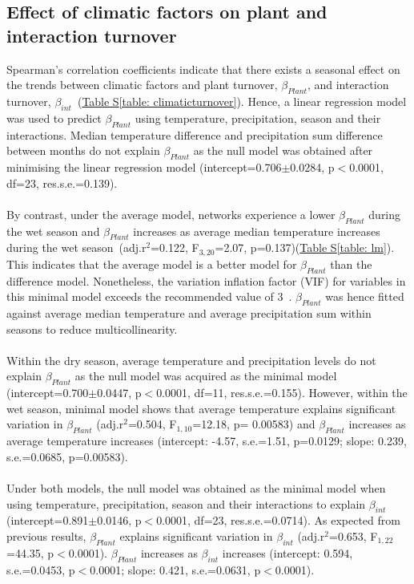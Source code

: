 \documentclass[11pt]{article}
\begin{document}
\vspace{0.5cm}
\subsection{Effect of climatic factors on plant and interaction turnover}
\label{subsec: climate}
Spearman's correlation coefficients indicate that there exists a seasonal effect on the trends between climatic factors and plant turnover, $\beta_{Plant}$, and interaction turnover, $\beta_{int}$~(\hyperref[table: climaticturnover]{Table S\ref{table: climaticturnover}}). Hence, a linear regression model was used to predict $\beta_{Plant}$ using temperature, precipitation, season and their interactions. Median temperature difference and precipitation sum difference between months do not explain $\beta_{Plant}$ as the null model was obtained after minimising the linear regression model (intercept=0.706$\pm$0.0284, p$<$0.0001, df=23, res.s.e.=0.139). \\
\\
By contrast, under the average model, networks experience a lower $\beta_{Plant}$ during the wet season and $\beta_{Plant}$ increases as average median temperature increases during the wet season~(adj.r$^{2}$=0.122, F$_{3,20}$=2.07, p=0.137)(\hyperref[table: lm]{Table S\ref{table: lm}}). This indicates that the average model is a better model for $\beta_{Plant}$ than the difference model. Nonetheless, the variation inflation factor (VIF) for variables in this minimal model exceeds the recommended value of 3~\citep{Zuur2010}. $\beta_{Plant}$ was hence fitted against average median temperature and average precipitation sum within seasons to reduce multicollinearity. \\
\\
Within the dry season, average temperature and precipitation levels do not explain $\beta_{Plant}$ as the null model was acquired as the minimal model (intercept=0.700$\pm$0.0447, p$<$0.0001, df=11, res.s.e.=0.155). However, within the wet season, minimal model shows that average temperature explains significant variation in $\beta_{Plant}$ (adj.r$^{2}$=0.504, F$_{1,10}$=12.18, p= 0.00583) and $\beta_{Plant}$ increases as average temperature increases (intercept: -4.57, s.e.=1.51, p=0.0129; slope: 0.239, s.e.=0.0685, p=0.00583). \\
\\
Under both models, the null model was obtained as the minimal model when using temperature, precipitation, season and their interactions to explain $\beta_{int}$ (intercept=0.891$\pm$0.0146, p$<$0.0001, df=23, res.s.e.=0.0714). As expected from previous results, $\beta_{Plant}$ explains significant variation in $\beta_{int}$ (adj.r$^{2}$=0.653, F$_{1,22}$=44.35, p$<$0.0001). $\beta_{Plant}$ increases as $\beta_{int}$ increases (intercept: 0.594, s.e.=0.0453, p$<$0.0001; slope: 0.421, s.e.=0.0631, p$<$0.0001). \\
\end{document}
